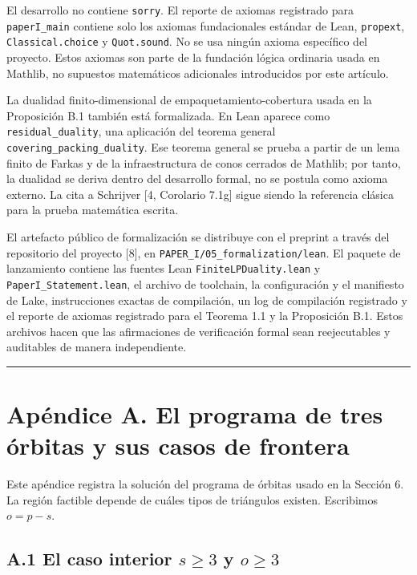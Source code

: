 \documentclass[
  11pt,
]{article}
\begin{document}
El desarrollo no contiene \texttt{sorry}. El reporte de axiomas
registrado para \texttt{paperI\_main} contiene solo los axiomas
fundacionales estándar de Lean, \texttt{propext},
\texttt{Classical.choice} y \texttt{Quot.sound}. No se usa ningún axioma
específico del proyecto. Estos axiomas son parte de la fundación lógica
ordinaria usada en Mathlib, no supuestos matemáticos adicionales
introducidos por este artículo.

La dualidad finito-dimensional de empaquetamiento-cobertura usada en la
Proposición B.1 también está formalizada. En Lean aparece como
\texttt{residual\_duality}, una aplicación del teorema general
\texttt{covering\_packing\_duality}. Ese teorema general se prueba a
partir de un lema finito de Farkas y de la infraestructura de conos
cerrados de Mathlib; por tanto, la dualidad se deriva dentro del
desarrollo formal, no se postula como axioma externo. La cita a
Schrijver {[}4, Corolario 7.1g{]} sigue siendo la referencia clásica
para la prueba matemática escrita.

El artefacto público de formalización se distribuye con el preprint a
través del repositorio del proyecto {[}8{]}, en
\texttt{PAPER\_I/05\_formalization/lean}. El paquete de lanzamiento
contiene las fuentes Lean \texttt{FiniteLPDuality.lean} y
\texttt{PaperI\_Statement.lean}, el archivo de toolchain, la
configuración y el manifiesto de Lake, instrucciones exactas de
compilación, un log de compilación registrado y el reporte de axiomas
registrado para el Teorema 1.1 y la Proposición B.1. Estos archivos
hacen que las afirmaciones de verificación formal sean reejecutables y
auditables de manera independiente.

\begin{center}\rule{0.5\linewidth}{0.5pt}\end{center}

\section{Apéndice A. El programa de tres órbitas y sus casos de
frontera}\label{apuxe9ndice-a.-el-programa-de-tres-uxf3rbitas-y-sus-casos-de-frontera}

Este apéndice registra la solución del programa de órbitas usado en la
Sección 6. La región factible depende de cuáles tipos de triángulos
existen. Escribimos \(o=p-s\).

\subsection{\texorpdfstring{A.1 El caso interior \(s\ge3\) y
\(o\ge3\)}{A.1 El caso interior s\textbackslash ge3 y o\textbackslash ge3}}\label{a.1-el-caso-interior-sge3-y-oge3}
\end{document}
